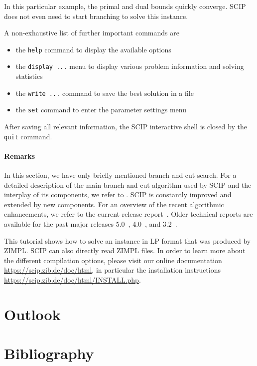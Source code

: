 \documentclass[a4paper,10pt]{article}
\begin{document}
In this particular example, the primal and dual bounds quickly converge.
%
SCIP does not even need to start branching to solve this instance.
%

A non-exhaustive list of further important commands are

\begin{itemize}
  \item the \texttt{help} command to display the available options
  \item the \texttt{display ...} menu to display various problem information and solving statistics
  \item the \texttt{write ...} command to save the best solution in a file
  \item the \texttt{set} command to enter the parameter settings menu
\end{itemize}

After saving all relevant information, the SCIP interactive shell is closed by the \texttt{quit} command.



\paragraph{Remarks}

In this section, we have only briefly mentioned branch-and-cut search.
%
For a detailed description of the main branch-and-cut algorithm used by SCIP and the interplay of its components, we refer to
\cite{Achterberg2007}.
%
SCIP is constantly improved and extended by new components.
%
For an overview of the recent algorithmic enhancements, we refer to the current release report~\cite{SCIP6}.
%
Older technical reports are available for the past major releases 5.0~\cite{SCIP5}, 4.0~\cite{SCIP4}, and 3.2~\cite{SCIP32}.

This tutorial shows how to solve an instance in LP format that was produced by ZIMPL.
%
SCIP can also directly read ZIMPL files.
%
In order to learn more about the different compilation options, please visit our online documentation \url{https://scip.zib.de/doc/html},
in particular the installation instructions \url{https://scip.zib.de/doc/html/INSTALL.php}.

\section{Outlook}


\cite{*}

\section*{Bibliography}



\end{document}
